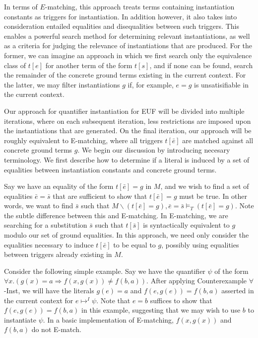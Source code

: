 \documentclass{llncs}
\begin{document}
In terms of $E$-matching, this approach treats terms containing instantiation constants as triggers for instantiation.
In addition however, it also takes into consideration entailed equalities and disequalities between such triggers.
This enables a powerful search method for determining relevant instantiations, as well as a criteria for judging the relevance of instantiations that are produced.
For the former, we can imagine an approach in which we first search only the equivalence class of $t[e]$ for another term of the form $t[s]$, and if none can be found, search the remainder of the concrete ground terms existing in the current context.
For the latter, we may filter instantiations $g$ if, for example, $e = g$ is unsatisifiable in the current context.

Our approach for quantifier instantiation for EUF will be divided into multiple iterations, where on each subsequent iteration, less restrictions are imposed upon the instantiations that are generated.
On the final iteration, our approach will be roughly equivalent to E-matching, where all triggers $t[\bar{e}]$ are matched against all concrete ground terms $g$.
We begin our discussion by introducing necesary terminology.
We first describe how to determine if a literal is induced by a set of equalities between instantiation constants and concrete ground terms.

Say we have an equality of the form $t[\bar{e}] = g$ in $M$, and we wish to find a set of equalities $\bar{e} = \bar{s}$ that are sufficient to show that $t[\bar{e}] = g$ must be true.
In other words, we want to find $\bar{s}$ such that $M \backslash (t[\bar{e}] = g), \bar{e} = \bar{s} \models_T (t[\bar{e}] = g)$.
Note the subtle difference between this and E-matching.
In E-matching, we are searching for a substitution $\bar{s}$ such that $t[\bar{s}]$ is syntactically equivalent to $g$ modulo our set of ground equalities.
In this approach, we need only consider the equalities necessary to induce $t[\bar{e}]$ to be equal to $g$, possibly using equalities between triggers already existing in $M$.

Consider the following simple example.
Say we have the quantifier $\psi$ of the form $\forall x. (g(x) = a \Rightarrow f( x, g( x ) ) \neq f( b, a ))$.
After applying Counterexample $\forall$-Inst, we will have the literals $g(e) = a$ and $f( e, g( e ) ) = f( b, a )$ asserted in the current context for $e \mapsto^I \psi$.
Note that $e = b$ suffices to show that $f( e, g( e ) ) = f( b, a )$ in this example, suggesting that we may wish to use $b$ to instantiate $\psi$.
In a basic implementation of E-matching, $f( x, g( x ) )$ and $f( b, a )$ do not E-match.
\end{document}
